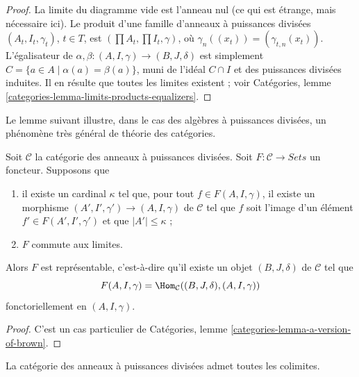 \begin{proof}
La limite du diagramme vide est l'anneau nul (ce qui est étrange, mais nécessaire ici). Le produit d'une famille d'anneaux à puissances divisées $(A_t, I_t, \gamma_t)$, $t \in T$, est $(\prod A_t, \prod I_t, \gamma)$, où $\gamma_n((x_t)) = (\gamma_{t, n}(x_t))$. L'égalisateur de $\alpha, \beta : (A, I, \gamma) \to (B, J, \delta)$ est simplement $C = \{a \in A \mid \alpha(a) = \beta(a)\}$, muni de l'idéal $C \cap I$ et des puissances divisées induites. Il en résulte que toutes les limites existent ; voir Catégories, lemme \ref{categories-lemma-limits-products-equalizers}.
\end{proof}

\noindent
Le lemme suivant illustre, dans le cas des algèbres à puissances divisées, un phénomène très général de théorie des catégories.

\begin{lemma}

\label{lemma-a-version-of-brown}

Soit $\mathcal{C}$ la catégorie des anneaux à puissances divisées. Soit
$F : \mathcal{C} \to \textit{Sets}$ un foncteur. Supposons que

\begin{enumerate}

\item il existe un cardinal $\kappa$ tel que, pour tout
$f \in F(A, I, \gamma)$, il existe un morphisme
$(A', I', \gamma') \to (A, I, \gamma)$ de $\mathcal{C}$ tel que $f$
soit l'image d'un élément $f' \in F(A', I', \gamma')$ et que $|A'| \leq \kappa$ ;
\item  $F$ commute aux limites.

\end{enumerate}

Alors $F$ est représentable, c'est-à-dire qu'il existe un objet $(B, J, \delta)$
de $\mathcal{C}$ tel que
$$
F(A, I, \gamma) = \Hom_\mathcal{C}((B, J, \delta), (A, I, \gamma))
$$
fonctoriellement en $(A, I, \gamma)$.

\end{lemma}

\begin{proof}
C'est un cas particulier de Catégories, lemme \ref{categories-lemma-a-version-of-brown}.
\end{proof}

\begin{lemma}

\label{lemma-colimits}

La catégorie des anneaux à puissances divisées admet toutes les colimites.

\end{lemma}

